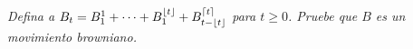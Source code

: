 \emph{
    Defina a $B_t=B^1_1+\cdots+B^{\lfloor t\rfloor}_1+B^{\lceil t \rceil}_{t-\lfloor t\rfloor}$ 
    para $t\geq 0$. Pruebe que $B$ es un movimiento browniano. 
}
\afterstatement\pn